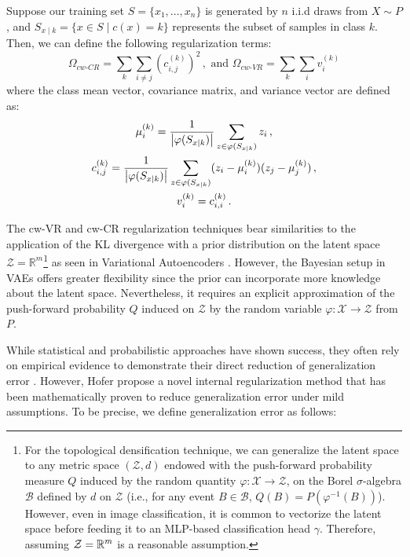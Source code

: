 \documentclass[../main.tex]{subfiles}
\begin{document}
Suppose our training set $S = \{x_1, ..., x_n\}$ is generated by $n$ i.i.d draws from $X \sim P$, and $S_{x\mid k} = \{x \in S \mid c(x) = k\}$ represents the subset of samples in class $k$. Then, we can define the following regularization terms:
\[
\Omega_{cw\text{-}CR}= \sum_{k} \sum_{i\neq j} \left(c_{i,j}^{(k)}\right)^2\,, \text{ and }
\Omega_{cw\text{-}VR}= \sum_{k} \sum_{i} v_{i}^{(k)}
\]
where the class mean vector, covariance matrix, and variance vector are defined as:
\begin{gather*}
\mu_i^{(k)} = \frac{1}{\left\lvert \varphi(S_{x\mid k}) \right\rvert} \sum_{z \in \varphi(S_{x\mid k})} z_i\,,\\
c_{i,j}^{(k)}= \frac{1}{\left\lvert \varphi(S_{x\mid k}) \right\rvert} \sum_{z \in \varphi(S_{x\mid k})} (z_i-\mu_i^{(k)})(z_j-\mu_j^{(k)})\,,\\
v_{i}^{(k)} =c_{i,i}^{(k)}\,.
\end{gather*}

\begin{remark}
The cw-VR and cw-CR regularization techniques bear similarities to the application of the KL divergence with a prior distribution on the latent space $\mathcal{Z} = \mathbb{R}^m$\footnote{For the topological densification technique, we can generalize the latent space to any metric space $(\mathcal{Z}, d)$ endowed with the push-forward probability measure $Q$ induced by the random quantity $\varphi: \mathcal{X} \to \mathcal{Z}$, on the Borel $\sigma$-algebra $\mathcal{B}$ defined by $d$ on $\mathcal{Z}$ (i.e., for any event $B\in \mathcal{B}$, ${Q(B)= P(\varphi^{-1}(B))}$).  However, even in image classification, it is common to vectorize the latent space before feeding it to an MLP-based classification head $\gamma$. Therefore, assuming $\mathcal{Z} = \mathbb{R}^m$ is a reasonable assumption.} as seen in Variational Autoencoders \cite{kingma_auto-encoding_2022}. However, the Bayesian setup in VAEs offers greater flexibility since the prior can incorporate more knowledge about the latent space. Nevertheless, it requires an explicit approximation of the push-forward probability $Q$ induced on $\mathcal{Z}$ by the random variable $\varphi: \mathcal{X} \to \mathcal{Z}$ from $P$.
\end{remark}

While statistical and probabilistic approaches have shown success, they often rely on empirical evidence to demonstrate their direct reduction of generalization error \cite{hofer_densified_2021}. However, Hofer \etal \cite{hofer_densified_2021} propose a novel internal regularization method that has been mathematically proven to reduce generalization error under mild assumptions. To be precise, we define generalization error as follows:
\end{document}
